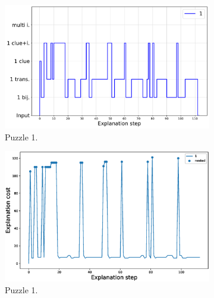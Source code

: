 

\begin{figure}[t!]
		\centering
		\begin{subfigure}{.5\textwidth}
				\centering
				\includegraphics[width=0.9\linewidth]{figures/plot_cost_steps_1.pdf}
				\caption{Puzzle 1.}
				\label{fig:composition_puzzle:p1}
		\end{subfigure}%
		\begin{subfigure}{.5\textwidth}
				\centering
				\includegraphics[width=0.84\linewidth]{figures/1.eps}
				\caption{Puzzle 1.}
				\label{fig:cost_puzzle:p1}
		\end{subfigure}
		\begin{subfigure}{.5\textwidth}
				\centering

\end{subfigure}
\end{figure}
